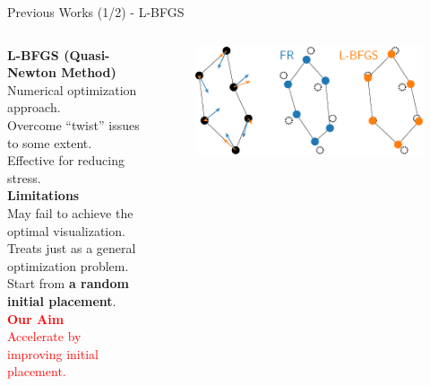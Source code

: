 \documentclass[dvipdfmx,13pt,aspectratio=169]{beamer}
\newcommand{\red}[1]{\textcolor{red}{#1}}
\newif\ifShowHidden
\begin{document}
\ifShowHidden
  \begin{frame}{``Twist'' Causes Stagnation}
    \large{%
      \textbf{Twist}: unnecessary folded and tangled structures~\cite{veldhuizenDynamicMultilevelGraph2007,cheongSnapshotVisualizationComplex2018}.\\
      $\to$ Causing stagnation of the simulation process.\\
      Slow for large-scale graphs. $\order{\abs{V}^2}$ per iteration.
    }
    \begin{figure}[htbp]
      \centering
      \animategraphics[autoplay,loop,width=0.4\columnwidth]{5}{circle/circle-}{1}{1}%
    \end{figure}
  \end{frame}
\fi

\ifShowHidden
  \begin{frame}{Previous Works (1/2) - L-BFGS}
    \begin{columns}
      \begin{column}{0.6\columnwidth}
        \large{\textbf{L-BFGS (Quasi-Newton Method)}}~\cite{6183577}\\
        \quad Numerical optimization approach.\\
        \quad Overcome ``twist'' issues to some extent.\\
        \quad Effective for reducing stress.\\[1.5em]
        \textbf{Limitations}\\
        \quad May fail to achieve the optimal visualization.\\
        \quad Treats just as a general optimization problem.\\
        \quad Start from \textbf{a random initial placement}.\\[1.5em]
        \textbf{\red{Our Aim}}\\
        \quad \red{Accelerate by improving initial placement.}\\
      \end{column}
      \begin{column}{0.4\columnwidth}
        \begin{figure}[htbp]
          \centering
          \includegraphics[width=\columnwidth]{../main/comparison/comparison_FRandLBFGS.pdf}

\end{figure}
\end{column}
\end{columns}
\end{frame}
\end{document}
